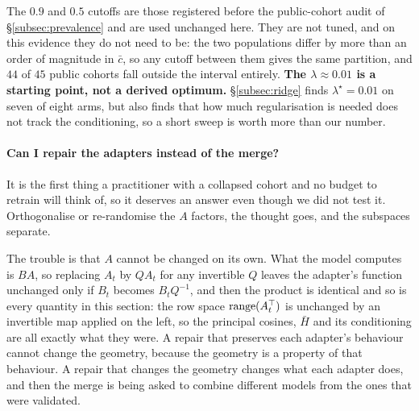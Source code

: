 \begin{center}
\end{center}

The $0.9$ and $0.5$ cutoffs are those registered before the public-cohort
audit of \S\ref{subsec:prevalence} and are used unchanged here. They are not
tuned, and on this evidence they do not need to be: the two populations differ
by more than an order of magnitude in $\bar c$, so any cutoff between them
gives the same partition, and $44$ of $45$ public cohorts fall outside the
interval entirely. \textbf{The $\lambda \approx 0.01$ is a starting point, not
a derived optimum.} \S\ref{subsec:ridge} finds $\lambda^\star = 0.01$ on seven
of eight arms, but also finds that how much regularisation is needed does not
track the conditioning, so a short sweep is worth more than our number.

\paragraph{Can I repair the adapters instead of the merge?} It is the first
thing a practitioner with a collapsed cohort and no budget to retrain will
think of, so it deserves an answer even though we did not test it. Orthogonalise
or re-randomise the $A$ factors, the thought goes, and the subspaces separate.

The trouble is that $A$ cannot be changed on its own. What the model computes
is $BA$, so replacing $A_t$ by $Q A_t$ for any invertible $Q$ leaves the
adapter's function unchanged only if $B_t$ becomes $B_t Q^{-1}$, and then the
product is identical and so is every quantity in this section: the row space
$\operatorname{range}(A_t^\top)$ is unchanged by an invertible map applied on the left, so
the principal cosines, $\bar H$ and its conditioning are all exactly what they
were. A repair that preserves each adapter's behaviour cannot change the
geometry, because the geometry is a property of that behaviour. A repair that
changes the geometry changes what each adapter does, and then the merge is
being asked to combine different models from the ones that were validated.

